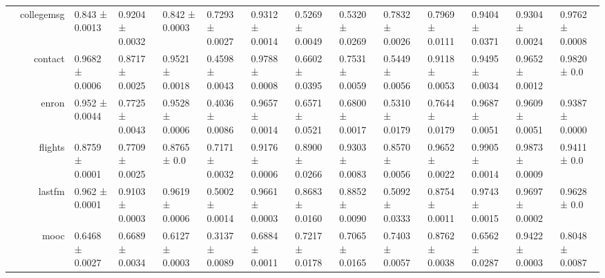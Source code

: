 {\begin{tabular}{@{}crllllllllllll@{}}
                                    & collegemsg           & 0.843 ± 0.0013            & 0.9204 ± 0.0032            & 0.842 ± 0.0003            & 0.7293 ± 0.0027            & \multicolumn{1}{l|}{0.9312 ± 0.0014} & 0.5269 ± 0.0049           & 0.5320 ± 0.0269           & 0.7832 ± 0.0026          & 0.7969 ± 0.0111         & 0.9404 ± 0.0371         & 0.9304 ± 0.0024          & 0.9762 ± 0.0008            \\
                                    & contact              & 0.9682 ± 0.0006           & 0.8717 ± 0.0025            & 0.9521 ± 0.0018           & 0.4598 ± 0.0043            & \multicolumn{1}{l|}{0.9788 ± 0.0008} & 0.6602 ± 0.0395           & 0.7531 ± 0.0059           & 0.5449 ± 0.0056          & 0.9118 ± 0.0053         & 0.9495 ± 0.0034         & 0.9652 ± 0.0012          & 0.9820 ± 0.0               \\
                                    & enron                & 0.952 ± 0.0044            & 0.7725 ± 0.0043            & 0.9528 ± 0.0006           & 0.4036 ± 0.0086            & \multicolumn{1}{l|}{0.9657 ± 0.0014} & 0.6571 ± 0.0521           & 0.6800 ± 0.0017           & 0.5310 ± 0.0179          & 0.7644 ± 0.0179         & 0.9687 ± 0.0051         & 0.9609 ± 0.0051          & 0.9387 ± 0.0000            \\
                                    & flights              & 0.8759 ± 0.0001           & 0.7709 ± 0.0025            & 0.8765 ± 0.0              & 0.7171 ± 0.0032            & \multicolumn{1}{l|}{0.9176 ± 0.0006} & 0.8900 ± 0.0266           & 0.9303 ± 0.0083           & 0.8570 ± 0.0056          & 0.9652 ± 0.0022         & 0.9905 ± 0.0014         & 0.9873 ± 0.0009          & 0.9411 ± 0.0               \\
                                    & lastfm               & 0.962 ± 0.0001            & 0.9103 ± 0.0003            & 0.9619 ± 0.0006           & 0.5002 ± 0.0014            & \multicolumn{1}{l|}{0.9661 ± 0.0003} & 0.8683 ± 0.0160           & 0.8852 ± 0.0090           & 0.5092 ± 0.0333          & 0.8754 ± 0.0011         & 0.9743 ± 0.0015         & 0.9697 ± 0.0002          & 0.9628 ± 0.0               \\
                                    & mooc                 & 0.6468 ± 0.0027           & 0.6689 ± 0.0034            & 0.6127 ± 0.0003           & 0.3137 ± 0.0089            & \multicolumn{1}{l|}{0.6884 ± 0.0011} & 0.7217 ± 0.0178           & 0.7065 ± 0.0165           & 0.7403 ± 0.0057          & 0.8762 ± 0.0038         & 0.6562 ± 0.0287         & 0.9422 ± 0.0003          & 0.8048 ± 0.0087            \\

\end{tabular}}
